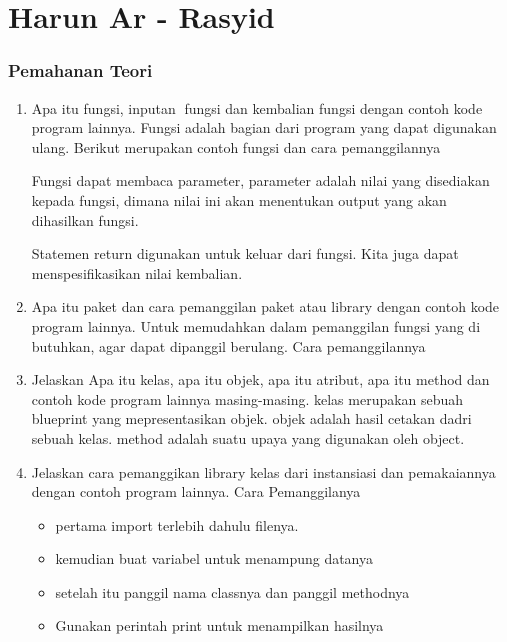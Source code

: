 \section{Harun Ar - Rasyid}
\subsubsection{Pemahanan Teori}
\begin{enumerate}
    \item Apa itu fungsi, inputan fungsi dan kembalian fungsi dengan contoh kode program lainnya.
    Fungsi adalah bagian dari program yang dapat digunakan ulang. Berikut merupakan contoh fungsi dan cara pemanggilannya
    
    Fungsi dapat membaca parameter, parameter adalah nilai yang disediakan kepada fungsi, dimana nilai ini akan menentukan output yang akan dihasilkan fungsi.
    
    Statemen return digunakan untuk keluar dari fungsi. Kita juga dapat menspesifikasikan nilai kembalian.
    
    \item Apa itu paket dan cara pemanggilan paket atau library dengan contoh kode program lainnya.
    Untuk memudahkan dalam pemanggilan fungsi yang di butuhkan, agar dapat dipanggil berulang. Cara pemanggilannya
    
    \item Jelaskan Apa itu kelas, apa itu objek, apa itu atribut, apa itu method dan contoh kode program lainnya masing-masing.
    kelas merupakan sebuah blueprint yang mepresentasikan objek. objek adalah hasil cetakan dadri sebuah kelas. method adalah suatu upaya yang digunakan oleh object.
    

    \item Jelaskan cara pemanggikan library kelas dari instansiasi dan pemakaiannya dengan contoh program lainnya.
    Cara Pemanggilanya
    \begin{itemize}
        \item pertama import terlebih dahulu filenya.
        \item kemudian buat variabel untuk menampung datanya
        \item setelah itu panggil nama classnya dan panggil methodnya
        \item Gunakan perintah print untuk menampilkan hasilnya


\end{itemize}
\end{enumerate}
